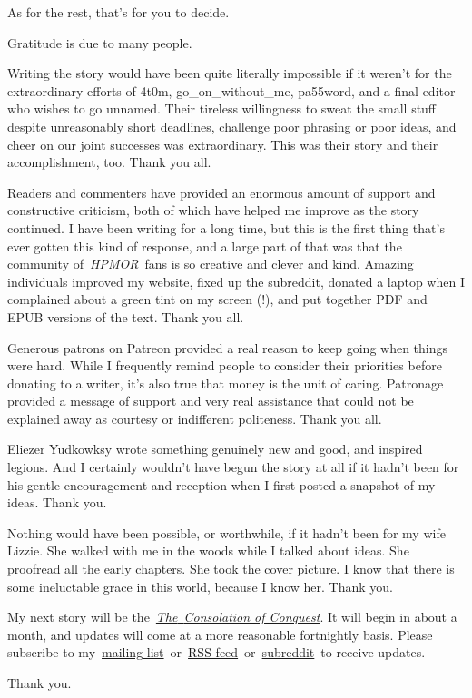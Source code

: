 As for the rest, that's for you to decide.

Gratitude is due to many people.

Writing the story would have been quite literally impossible if it
weren't for the extraordinary efforts of 4t0m, go\_on\_without\_me,
pa55word, and a final editor who wishes to go unnamed. Their tireless
willingness to sweat the small stuff despite unreasonably short
deadlines, challenge poor phrasing or poor ideas, and cheer on our joint
successes was extraordinary. This was their story and their
accomplishment, too. Thank you all.

Readers and commenters have provided an enormous amount of support and
constructive criticism, both of which have helped me improve as the
story continued. I have been writing for a long time, but this is the
first thing that's ever gotten this kind of response, and a large part
of that was that the community of~\emph{HPMOR}~fans is so creative and
clever and kind. Amazing individuals improved my website, fixed up the
subreddit, donated a laptop when I complained about a green tint on my
screen (!), and put together PDF and EPUB versions of the text. Thank
you all.

Generous patrons on Patreon provided a real reason to keep going when
things were hard. While I frequently remind people to consider their
priorities before donating to a writer, it's also true that money is the
unit of caring. Patronage provided a message of support and very real
assistance that could not be explained away as courtesy or indifferent
politeness. Thank you all.

Eliezer Yudkowksy wrote something genuinely new and good, and inspired
legions. And I certainly wouldn't have begun the story at all if it
hadn't been for his gentle encouragement and reception when I first
posted a snapshot of my ideas. Thank you.

Nothing would have been possible, or worthwhile, if it hadn't been for
my wife Lizzie. She walked with me in the woods while I talked about
ideas. She proofread all the early chapters. She took the cover picture.
I know that there is some ineluctable grace in this world, because I
know her. Thank you.

My next story will be
the~\href{http://www.anarchyishyperbole.com/p/conquest.html}{\emph{The}~\emph{Consolation
of Conquest}}. It will begin in about a month, and updates will come at
a more reasonable fortnightly basis. Please subscribe to
my~\href{http://eepurl.com/bLNHdz}{mailing
list}~or~\href{http://www.anarchyishyperbole.com/feeds/posts/default}{RSS
feed}~or~\href{https://www.reddit.com/r/AiH}{subreddit}~to receive
updates.

Thank you.

\Stopbonus
